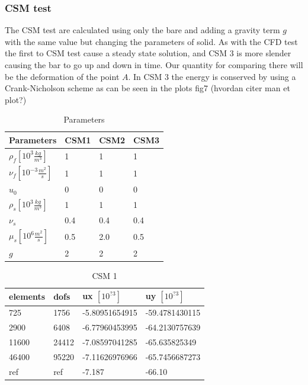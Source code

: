 \subsubsection{CSM test}
The CSM test are calculated using only the bare and adding a gravity term $g$ with the same value but changing the parameters of solid.
As with the CFD test the first to CSM test cause a steady state solution, and CSM 3 is more slender causing the bar to go up and down in time. Our quantity for comparing there will be the deformation of the point $A$. In CSM 3 the energy is conserved by using a Crank-Nicholson scheme as can be seen in the plots fig7 (hvordan citer man et plot?)

\begin{table}[h!]
\centering
\caption{Parameters}
\label{my-label}
\begin{tabular}{|l|l|l|l|}
\hline
Parameters & CSM1 & CSM2 & CSM3 \\ \hline
$\rho_f[10^3 \frac{kg}{m^3}]$ & 1 & 1 & 1 \\ \hline
$\nu_f [10^{-3} \frac{m^2}{s}]$ & 1 & 1 & 1 \\ \hline
$u_0$ & 0 & 0 & 0 \\ \hline
$\rho_s[10^3 \frac{kg}{m^3}]$ & 1 & 1 & 1 \\ \hline
$\nu_s$ & 0.4 & 0.4 & 0.4 \\ \hline
$\mu_s[10^6 \frac{m^2}{s}]$ & 0.5 & 2.0 & 0.5 \\ \hline
$g $ & 2 & 2 & 2 \\ \hline
\end{tabular}
\end{table}

\begin{table}[h!]
\centering
\caption{CSM 1}
\label{my-label}
\begin{tabular}{|l|l|l|l|}
\hline
elements & dofs & ux $[10^{?3}]$ & uy $[10^{?3}]$ \\ \hline
725 & 1756 & -5.80951654915 & -59.4781430115 \\ \hline
2900 & 6408 & -6.77960453995 & -64.2130757639 \\ \hline
11600 & 24412 & -7.08597041285 & -65.635825349 \\ \hline
46400 & 95220 & -7.11626976966 & -65.7456687273 \\ \hline
ref & ref & -7.187 & -66.10 \\ \hline
\end{tabular}
\end{table}

